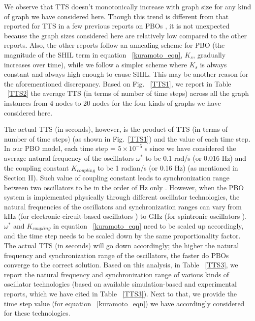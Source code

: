 \documentclass[%
 reprint,
 amsmath,amssymb,
 aps,
]{revtex4-2}
\begin{document}
We observe that TTS doesn't monotonically increase with graph size for any kind of graph we have considered here. Though this trend is different from that reported for TTS in a few previous reports on PBOs \citep{Circuit3,MIT2}, it is not unexpected because the graph sizes considered here are relatively low compared to the other reports. Also, the other reports \citep{Circuit3,MIT2} follow an annealing scheme for PBO (the magnitude of the SHIL term in equation ~\ref{kuramoto_eqn}, $K_s$, gradually increases over time), while we follow a simpler scheme where $K_s$ is always constant and always high enough to cause SHIL. This may be another reason for the aforementioned discrepancy. Based on Fig. ~\ref{TTS1}, we report in Table ~\ref{TTS2} the average TTS (in terms of number of time steps) across all the graph instances from 4 nodes to 20 nodes for the four kinds of graphs we have considered here.

The actual TTS (in seconds), however, is the product of TTS (in terms of number of time steps) (as shown in Fig.~\ref{TTS1}) and the value of each time step. In our PBO model, each time step = $5\times 10^{-5}$ s since we have considered the average natural frequency of the oscillators $\omega^{*}$ to be 0.1 rad/s (or 0.016 Hz) and the coupling constant $K_{coupling}$ to be 1 radian/s (or 0.16 Hz) (as mentioned in Section II). Such value of coupling constant leads to synchronization range between two oscillators to be in the order of Hz only \citep{Spin_DB1,Vassileva}. However, when the PBO system is implemented physically through different oscillator technologies, the natural frequencies of the oscillators and synchronization ranges can vary from kHz (for electronic-circuit-based oscillators \citep{Circuit5,Circuit6}) to GHz (for spintronic oscillators \citep{Spin_Akerman1,Spin_DB1}). $\omega^{*}$ and $K_{coupling}$ in equation ~\ref{kuramoto_eqn} need to be scaled up accordingly, and the time step needs to be scaled down by the same proportionality factor. The actual TTS (in seconds) will go down accordingly; the higher the natural frequency and synchronization range of the oscillators, the faster do PBOs converge to the correct solution. Based on this analysis, in Table ~\ref{TTS3}, we report the natural frequency and synchronization range of various kinds of oscillator technologies (based on available simulation-based and experimental reports, which we have cited in Table ~\ref{TTS3}). Next to that, we provide the time step value (for equation ~\ref{kuramoto_eqn}) we have accordingly considered for these technologies.
\end{document}
